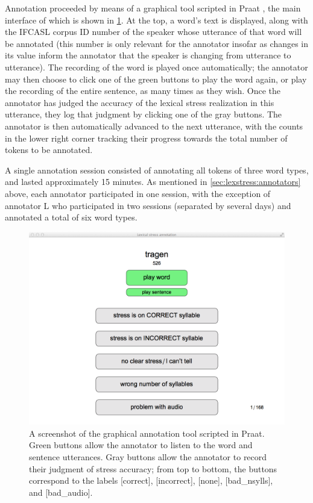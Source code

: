 	Annotation proceeded by means of a graphical tool scripted in Praat \parencite{Boersma2014}, the main interface of which is shown in \cref{fig:annotationtool}. At the top, a word's text is displayed, along with the IFCASL corpus ID number of the speaker whose utterance of that word will be annotated (this number is only relevant for the annotator insofar as changes in its value inform the annotator that the speaker is changing from utterance to utterance). The recording of the word
is played once automatically; the annotator may then choose to click one of the green buttons to play the word again, or play the recording of the entire sentence, as many times as they wish. Once the annotator has judged the accuracy of the lexical stress realization in this utterance, they log that judgment by clicking one of the gray buttons. The annotator is then automatically advanced to the next utterance, with the counts in the lower right corner tracking their progress towards the total number of tokens to be annotated. 

A single annotation session consisted of annotating all tokens of three word types, and lasted approximately 15 minutes. As mentioned in \cref{sec:lexstress:annotators} above, each annotator participated in one session, with the exception of annotator L who participated in two sessions (separated by several days) and annotated a total of six word types.
	
		\begin{figure}[bht]
			\centering
			\includegraphics[width=\textwidth]{img/screenshots/AnnotationTool}
			\caption[A screenshot of the graphical annotation tool scripted in Praat.]{A screenshot of the graphical annotation tool scripted in Praat. Green buttons allow the annotator to listen to  the word and sentence utterances. Gray buttons allow the annotator to record their judgment of stress accuracy; from top to bottom, the buttons correspond to the labels [correct], [incorrect], [none], [bad\_nsylls], and [bad\_audio]. }
			\label{fig:annotationtool}
		\end{figure}
		

